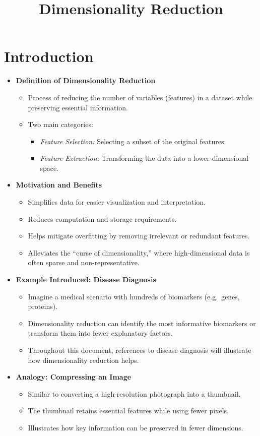 \documentclass[10pt]{article}
\title{Dimensionality Reduction}
\author{}
\date{}
\begin{document}
\maketitle

\section{Introduction}
\begin{itemize}
    \item \textbf{Definition of Dimensionality Reduction}
    \begin{itemize}
        \item Process of reducing the number of variables (features) in a dataset while preserving essential information.
        \item Two main categories:
        \begin{itemize}
            \item \emph{Feature Selection:} Selecting a subset of the original features.
            \item \emph{Feature Extraction:} Transforming the data into a lower-dimensional space.
        \end{itemize}
    \end{itemize}
    \item \textbf{Motivation and Benefits}
    \begin{itemize}
        \item Simplifies data for easier visualization and interpretation.
        \item Reduces computation and storage requirements.
        \item Helps mitigate overfitting by removing irrelevant or redundant features.
        \item Alleviates the ``curse of dimensionality,'' where high-dimensional data is often sparse and non-representative.
    \end{itemize}
    \item \textbf{Example Introduced: Disease Diagnosis}
    \begin{itemize}
        \item Imagine a medical scenario with hundreds of biomarkers (e.g.\ genes, proteins).
        \item Dimensionality reduction can identify the most informative biomarkers or transform them into fewer explanatory factors.
        \item Throughout this document, references to disease diagnosis will illustrate how dimensionality reduction helps.
    \end{itemize}
    \item \textbf{Analogy: Compressing an Image}
    \begin{itemize}
        \item Similar to converting a high-resolution photograph into a thumbnail.
        \item The thumbnail retains essential features while using fewer pixels.
        \item Illustrates how key information can be preserved in fewer dimensions.
    \end{itemize}
\end{itemize}
\end{document}
